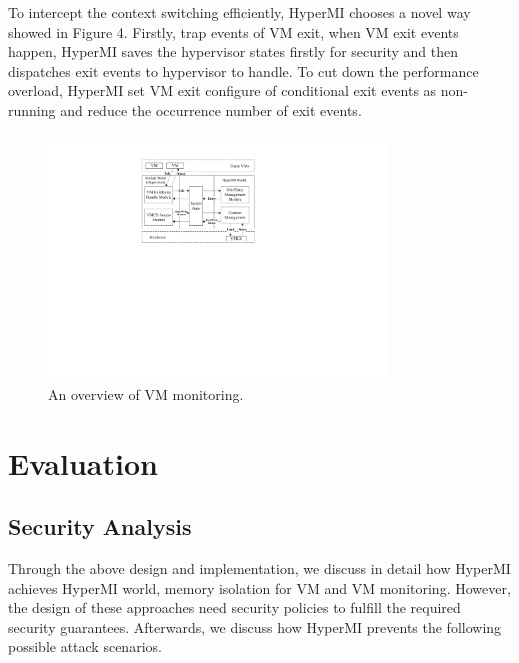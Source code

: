 \documentclass[conference]{IEEEtran}
\begin{document}
%
%
To intercept the context switching efficiently, HyperMI chooses a novel way showed in Figure 4. Firstly, trap events of VM exit, when VM exit events happen, HyperMI saves the hypervisor states firstly for security and then dispatches exit events to hypervisor to handle. To cut down the performance overload, HyperMI set VM exit configure of conditional exit events as non-running and reduce the occurrence number of exit events.

\begin{figure}
\centerline{\includegraphics[width=9cm,height=6.5cm]{pdfvmcs4.pdf}}%
\caption{An overview of VM monitoring.} \label{fig4}
\end{figure}


\section{Evaluation}
\subsection{Security Analysis}
Through the above design and implementation, we discuss in detail how HyperMI achieves HyperMI world,
memory isolation for VM and VM monitoring. However, the design of these approaches need security policies to fulfill the required security guarantees. Afterwards, we discuss how HyperMI prevents the following possible attack scenarios.
\end{document}
